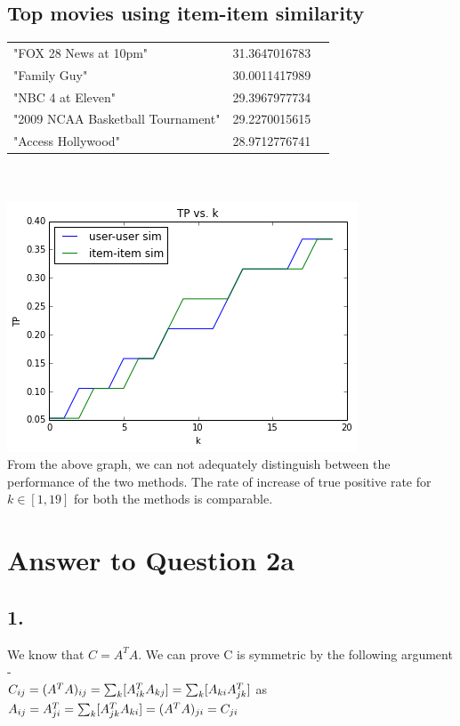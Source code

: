 \documentclass[11pt]{article}
\begin{document}
{\subsection*{Top movies using item-item similarity}
\begin{tabular}{ l c r }
"FOX 28 News at 10pm" & 31.3647016783\\
"Family Guy" & 30.0011417989\\
"NBC 4 at Eleven" & 29.3967977734\\
"2009 NCAA Basketball Tournament" & 29.2270015615\\
"Access Hollywood" & 28.9712776741\\
\end{tabular}\\
\\

\includegraphics*{q1cc}\\

From the above graph, we can not adequately distinguish between the performance of the two methods. The rate of increase of true positive rate for $k \in [1,19]$ for both the methods is comparable.

\pagebreak[4]
\section*{Answer to Question 2a}

\subsection*{1.}
We know that $C =A^TA$. We can prove C is symmetric by the following argument - \\

$C_{ij} = (A^T  A)_{ij} \\
= \sum_k [ A^T_{ik}  A_{kj} ] \\
= \sum_k [ A_{ki}  A^T_{jk} ]$ as $A_{ij} = A^T_{ji} \\
= \sum_k [ A^T_{jk}  A_{ki} ] \\
= (A^T  A)_{ji}\\
= C_{ji}$ \\

}
\end{document}
